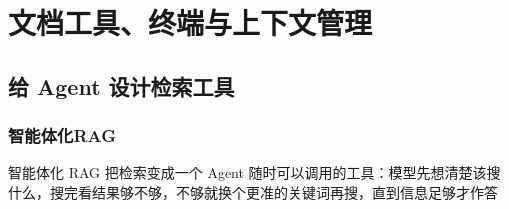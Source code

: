 \chapter{文档工具、终端与上下文管理}

\section{给 Agent 设计检索工具}

\subsection{智能体化RAG}
\begin{definition}
    智能体化 RAG 把检索变成一个 Agent 随时可以调用的工具：模型先想清楚该搜什么，搜完看结果够不够，不够就换个更准的关键词再搜，直到信息足够才作答
\end{definition}

